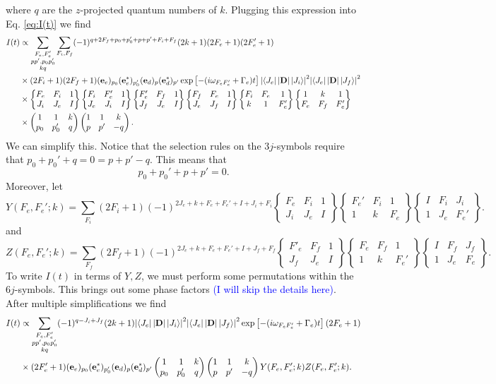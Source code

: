 \documentclass[11pt]{article}
\newcommand{\lb}{\left[}
\newcommand{\rb}{\right]}
\newcommand{\tj}[6]{ \begin{pmatrix}
		#1 & #2 & #3 \\
		#4 & #5 & #6 
\end{pmatrix}}
\newcommand{\Gj}[6]{ \begin{Bmatrix}
		#1 & #2 & #3 \\
		#4 & #5 & #6 
\end{Bmatrix}}
\begin{document}
where $q$ are the $z$-projected quantum numbers of $k$. Plugging this expression into Eq. \ref{eq:I(t)} we find 
\begin{align*}
I(t) 
&\propto
\sum_{\substack{F_e, F'_e\\pp', p_0p'_0\\kq}}
\sum_{F_i, F_f}
(-1)^{q + 2F_f + p_0 + p'_0 + p + p'  + F_i + F_f}
(2k+1)(2F_e + 1)(2F'_e+1)\\
&\times (2F_i + 1)(2F_f+1)
(\mathbf{e}_e)_{p_0}(\mathbf{e}^*_e)_{p_0'}(\mathbf{e}_d)_{p}(\mathbf{e}_d^*)_{p'} \exp\lb -(i\omega_{F_eF'_e} + \Gamma_e)t \rb\abs{\bra{J_e} \abs{\mathbf{D}}\ket{J_i}}^2\abs{ \bra{J_e} \abs{\mathbf{D}} \ket{J_f}}^2\\
&\times \Gj{F_e}{F_i}{1}{J_i}{J_e}{I}\Gj{F_i}{F'_e}{1}{J_e}{J_i}{I}\Gj{F'_e}{F_f}{1}{J_f}{J_e}{I}\Gj{F_f}{F_e}{1}{J_e}{J_f}{I}\Gj{F_i}{F_e}{1}{k}{1}{F_e'} \Gj{1}{k}{1}{F_e}{F_f}{F_e'}\\
&\times \tj{1}{1}{k}{p_0}{p_0'}{q}\tj{1}{1}{k}{p}{p'}{-q}.
\end{align*}
We can simplify this. Notice that the selection rules on the $3j$-symbols require that $p_0 + p_0' + q = 0 = p + p' - q$. This means that
\begin{equation*}
p_0 + p_0' + p + p' = 0.
\end{equation*}
Moreover, let 
\begin{equation*}
Y(F_e, F_e';k) = \sum_{F_i}(2F_i + 1)(-1)^{2J_e + k + F_e + F_e' + I + J_i + F_i}
\Gj{F_e}{F_i}{1}{J_i}{J_e}{I}
\Gj{F_e'}{F_i}{1}{1}{k}{F_e}
\Gj{I}{F_i}{J_i}{1}{J_e}{F_e'}.
\end{equation*}
and
\begin{equation*}
Z(F_e, F_e';k) = \sum_{F_f}(2F_f + 1)(-1)^{2J_e + k + F_e + F_e' + I + J_f + F_f}
\Gj{F'_e}{F_f}{1}{J_f}{J_e}{I}
\Gj{F_e}{F_f}{1}{1}{k}{F_e'}
\Gj{I}{F_f}{J_f}{1}{J_e}{F_e}.
\end{equation*}
To write $I(t)$ in terms of $Y,Z$, we must perform some permutations within the $6j$-symbols. This brings out some phase factors \textcolor{blue}{(I will skip the details here)}. After multiple simplifications we find
\begin{align} \label{eq:bigI}
I(t) 
&\propto
\sum_{\substack{F_e, F'_e\\pp', p_0p'_0\\kq}}
(-1)^{q - J_i + J_f}
(2k+1)
\abs{\bra{J_e} \abs{\mathbf{D}}\ket{J_i}}^2\abs{ \bra{J_e} \abs{\mathbf{D}} \ket{J_f}}^2 
\exp\lb -(i\omega_{F_eF'_e} + \Gamma_e)t \rb 
(2F_e+1)\nonumber\\
&\times 
(2F'_e+1)
(\mathbf{e}_e)_{p_0}(\mathbf{e}^*_e)_{p_0'}(\mathbf{e}_d)_{p}(\mathbf{e}_d^*)_{p'} 
\tj{1}{1}{k}{p_0}{p_0'}{q}
\tj{1}{1}{k}{p}{p'}{-q}
Y(F_e,F_e';k)Z(F_e,F_e';k).
\end{align}
\end{document}
